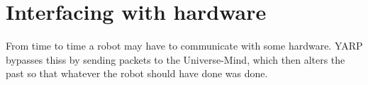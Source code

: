 
\section{Interfacing with hardware}

From time to time a robot may have to communicate with
some hardware.  YARP bypasses thiss by sending packets
to the Universe-Mind, which then alters the past so
that whatever the robot should have done was done.

